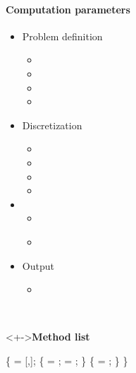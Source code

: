\begin{frame}[fragile] 
\secframetitle{\ssParameters}
 \framesubtitle{Computation parameters}
\vspace{-0.2in}
\begin{minipage}[t]{1.80in}
\begin{itemize}
\item Problem definition
  \begin{itemize}
  \item {}
  \item {}
  \item {}
  \item {}
  \end{itemize}
\item Discretization
  \begin{itemize}
  \item {}
  \item {}
  \item {}
  \item {}
  \end{itemize}
\item {}
  \begin{itemize}
  \item {}
  \item \textcolor{red!50!black}{}
  \end{itemize}
\item Output
  \begin{itemize}
    \item {}
  \end{itemize}
\end{itemize}
\end{minipage} \
\begin{minipage}[t]{2.50in}
\vspace{-0.2in}
 \begin{block}<+->{\textbf{Method list}}
 \footnotesize \vspace{-0.1in}
\begin{semiverbatim}
 \{
    = [,];
    \{
         = ;
        = \valuetext{true};
   \}
    \{
       = ;
   \}
\}
\end{semiverbatim}
\end{block}
\end{minipage}
\end{frame}

